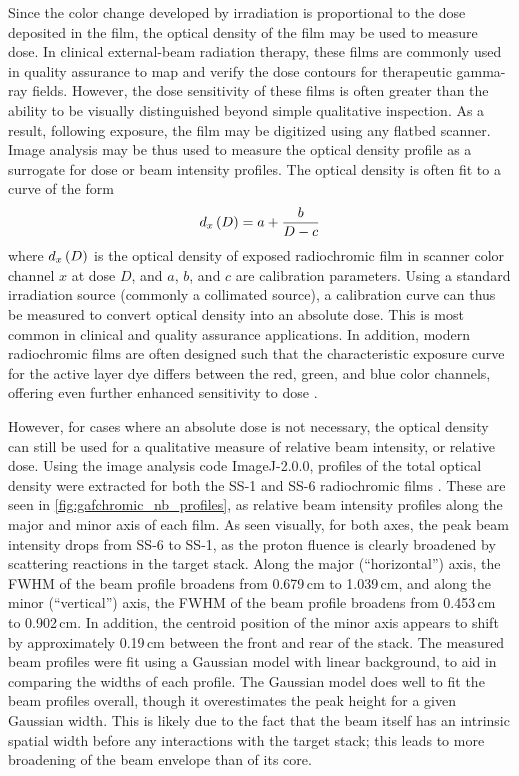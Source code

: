 Since the color change developed by irradiation is proportional to the dose deposited in the film, the optical density of the film may be used to measure dose.
In clinical external-beam radiation therapy, these films are commonly used in quality assurance  to map and verify  the dose contours for therapeutic gamma-ray fields.
However, the dose sensitivity of these films is often greater than the ability to be visually distinguished beyond simple qualitative inspection.
As a result, following exposure, the film may be digitized using any flatbed scanner.
Image analysis may be thus used to measure the optical density profile as a surrogate for dose or beam intensity profiles.
The optical density is often fit to a curve of the form
\begin{equation}
d_x\left( D\right) = a + \dfrac{b}{D-c}
\end{equation}
where $d_x\left( D\right)$ is the optical density of exposed radiochromic film in scanner color channel $x$ at dose $D$, and $a$, $b$, and $c$ are calibration parameters.
Using a standard irradiation source (commonly a collimated  source), a calibration curve can thus be measured to convert optical density into an absolute dose.
This is most common in clinical and quality assurance applications.
In addition, modern radiochromic films are often designed such that the characteristic exposure curve for the active layer dye differs between the red, green, and blue color channels, offering even further enhanced sensitivity to dose \cite{bushberg2011essential,Andre2011,David2012}.





However, for cases where an absolute dose is not necessary, the optical density can still be used for a qualitative measure of relative beam intensity, or relative dose.
Using the image analysis code  ImageJ-2.0.0,  profiles of the total optical density were extracted for both the SS-1 and SS-6 radiochromic films \cite{Rueden2017}.
These are seen in \autoref{fig:gafchromic_nb_profiles}, as relative beam intensity profiles along the major and minor axis of each film.
As seen visually, for both axes, the peak beam intensity drops from SS-6 to SS-1, as the proton fluence is clearly broadened by scattering reactions in the target stack.
Along the major (\enquote{horizontal}) axis, the FWHM of the beam profile broadens from 0.679\,cm to 1.039\,cm, and along the minor (\enquote{vertical}) axis, the FWHM of the beam profile broadens from 0.453\,cm to 0.902\,cm.
In addition, the centroid position of the minor axis appears to shift by approximately 0.19\,cm between the front and rear of the stack. 
The measured beam profiles were fit using a Gaussian model with linear background, to aid in comparing the widths of each profile.
The Gaussian model does well to fit the beam profiles overall, though it overestimates the peak height for a given Gaussian width.
This is likely due to the fact that the beam itself has an intrinsic spatial width before any interactions with the target stack; this leads to more broadening of the beam envelope than of its core.

